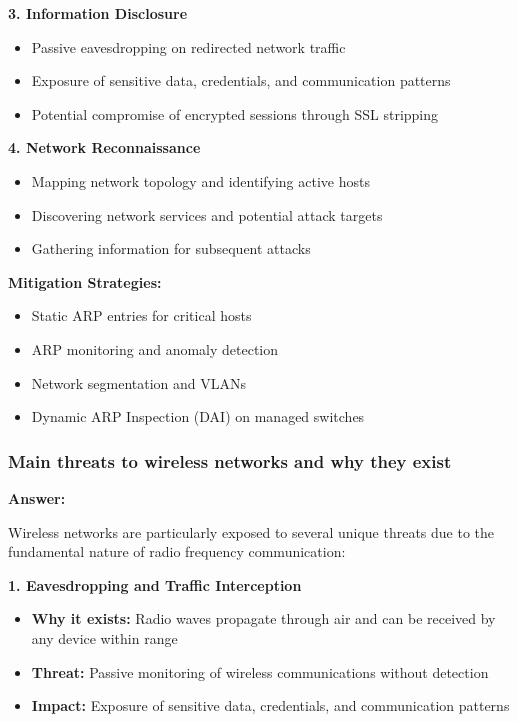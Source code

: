 \documentclass[12pt,a4paper]{article}
\begin{document}
\textbf{3. Information Disclosure}
\begin{itemize}
    \item Passive eavesdropping on redirected network traffic
    \item Exposure of sensitive data, credentials, and communication patterns
    \item Potential compromise of encrypted sessions through SSL stripping
\end{itemize}

\textbf{4. Network Reconnaissance}
\begin{itemize}
    \item Mapping network topology and identifying active hosts
    \item Discovering network services and potential attack targets
    \item Gathering information for subsequent attacks
\end{itemize}

\textbf{Mitigation Strategies:}
\begin{itemize}
    \item Static ARP entries for critical hosts
    \item ARP monitoring and anomaly detection
    \item Network segmentation and VLANs
    \item Dynamic ARP Inspection (DAI) on managed switches
\end{itemize}

\subsubsection{Main threats to wireless networks and why they exist}

\textbf{Answer:}

Wireless networks are particularly exposed to several unique threats due to the fundamental nature of radio frequency communication:

\textbf{1. Eavesdropping and Traffic Interception}
\begin{itemize}
    \item \textbf{Why it exists:} Radio waves propagate through air and can be received by any device within range
    \item \textbf{Threat:} Passive monitoring of wireless communications without detection
    \item \textbf{Impact:} Exposure of sensitive data, credentials, and communication patterns
\end{itemize}
\end{document}
